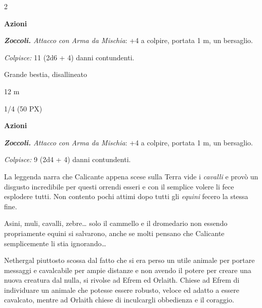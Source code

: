 \begin{multicols}{2}
{\textbf{Azioni}

\emph{\textbf{Zoccoli.} Attacco con Arma da Mischia}: +4 a colpire, portata 1 m, un bersaglio.

\emph{Colpisce:} 11 (2d6 + 4) danni contundenti.


\begin{description}[noitemsep, topsep=0pt, parsep=0pt, partopsep=0pt, itemsep=1pt, leftmargin=2.35cm,  labelwidth=2.2cm, itemindent=0cm, listparindent=0pt] %
\setlength{\baselineskip}{10pt}
\item[\textbf{Taglia/Tipo}] Grande bestia, disallineato
\item[\textbf{Caratt.}] 
\item[\textbf{Punti Ferita}] 
\item[\textbf{Tiri Salvez.}] 
\item[\textbf{Movimento}] 12 m
\item[\textbf{Sfida}] 1/4 (50 PX)
\end{description}
\smallskip

\textbf{Azioni}

\emph{\textbf{Zoccoli.} Attacco con Arma da Mischia}: +4 a colpire, portata 1 m, un bersaglio.

\emph{Colpisce:} 9 (2d4 + 4) danni contundenti.


\begin{giocatore}[Il Saurovallo]
La leggenda narra che Calicante appena scese sulla Terra vide i \emph{cavalli} e provò un disgusto incredibile per questi orrendi esseri e con il semplice volere li fece esplodere tutti. Non contento pochi attimi dopo tutti gli \emph{equini} fecero la stessa fine.

Asini, muli, cavalli, zebre… solo il cammello e il dromedario non essendo propriamente equini si salvarono, anche se molti pensano che Calicante semplicemente li stia ignorando…

Nethergal piuttosto scossa dal fatto che si era perso un utile animale per portare messaggi e cavalcabile per ampie distanze e non avendo il potere per creare una nuova creatura dal nulla, si rivolse ad Efrem ed Orlaith. Chiese ad Efrem di individuare un animale che potesse essere robusto, veloce ed adatto a essere cavalcato, mentre ad Orlaith chiese di inculcargli obbedienza e il coraggio.


\end{giocatore}}
\end{multicols}
